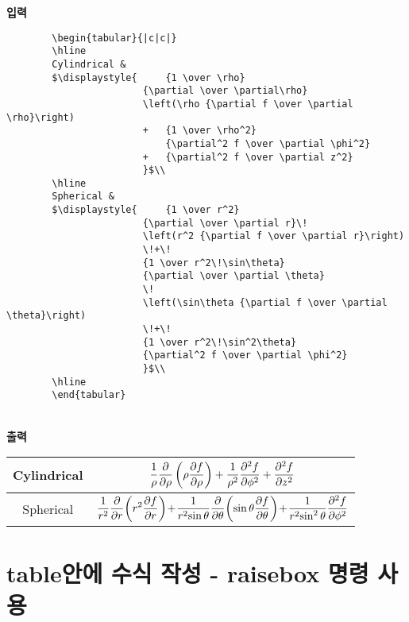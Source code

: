\documentclass[12pt,a4paper]{report}
\begin{document}
	\singlespacing
	\textbf{입력}\\
		\begin{boxedminipage}[t]{1.0\linewidth}
		\small
		\begin{verbatim}	
		\begin{tabular}{|c|c|}
		\hline
		Cylindrical & 
		$\displaystyle{ 	{1 \over \rho}
						{\partial \over \partial\rho}
						\left(\rho {\partial f \over \partial \rho}\right)
						+ 	{1 \over \rho^2}
							{\partial^2 f \over \partial \phi^2}  
						+ 	{\partial^2 f \over \partial z^2}
						}$\\
		\hline
		Spherical & 
		$\displaystyle{ 	{1 \over r^2}
						{\partial \over \partial r}\!
						\left(r^2 {\partial f \over \partial r}\right)
						\!+\!
						{1 \over r^2\!\sin\theta}
						{\partial \over \partial \theta}
						\!
						\left(\sin\theta {\partial f \over \partial \theta}\right)
						\!+\!
						{1 \over r^2\!\sin^2\theta}
						{\partial^2 f \over \partial \phi^2}
						}$\\
		\hline
		\end{tabular}
		\end{verbatim} 
		\end{boxedminipage} \\

		\textbf{출력}\\
		
	\doublespacing

		\begin{tabular}{|c|c|}
		\hline
		Cylindrical & 
		$\displaystyle{ 	{1 \over \rho}
						{\partial \over \partial\rho}
						\left(\rho {\partial f \over \partial \rho}\right)
						+ 	{1 \over \rho^2}
							{\partial^2 f \over \partial \phi^2}  
						+ 	{\partial^2 f \over \partial z^2}
						}$\\
		\hline
		Spherical & 
		$\displaystyle{ 	{1 \over r^2}
						{\partial \over \partial r}\!
						\left(r^2 {\partial f \over \partial r}\right)
						\!+\!
						{1 \over r^2\!\sin\theta}
						{\partial \over \partial \theta}
						\!
						\left(\sin\theta {\partial f \over \partial \theta}\right)
						\!+\!
						{1 \over r^2\!\sin^2\theta}
						{\partial^2 f \over \partial \phi^2}
						}$\\
		\hline
		\end{tabular}
		
\newpage
\section{table안에 수식 작성 - raisebox 명령 사용 }
\null
		
\end{document}
